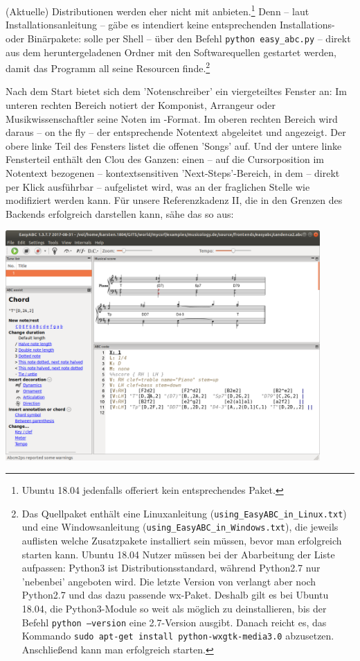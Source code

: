 (Aktuelle) Distributionen werden  eher nicht mit
anbieten.\footnote{Ubuntu 18.04 jedenfalls offeriert kein entsprechendes Paket.}
Denn -- laut  Installationsanleitung -- gäbe es intendiert keine
entsprechenden Installations- oder Binärpakete:  solle per Shell --
über den Befehl \texttt{python easy\_abc.py} -- direkt aus dem heruntergeladenen
Ordner mit den Softwarequellen gestartet werden, damit das Programm all seine
Resourcen finde.\footnote{Das Quellpaket enthält eine Linuxanleitung
(\texttt{using\_EasyABC\_in\_Linux.txt}) und eine Windowsanleitung
(\texttt{using\_EasyABC\_in\_Windows.txt}), die jeweils auflisten welche
Zusatzpakete installiert sein müssen, bevor man  erfolgreich
starten kann. Ubuntu 18.04 Nutzer müssen bei der Abarbeitung der Liste
aufpassen: Python3 ist Distributionsstandard, während Python2.7 nur 'nebenbei'
angeboten wird. Die letzte Version von  verlangt aber noch
Python2.7 und das dazu passende wx-Paket. Deshalb gilt es bei Ubuntu 18.04, die
Python3-Module so weit als möglich zu deinstallieren, bis der Befehl
\texttt{python --version} eine 2.7-Version ausgibt. Danach reicht es, das
Kommando \texttt{sudo apt-get install python-wxgtk-media3.0}
abzusetzen. Anschließend kann man  erfolgreich starten.}

Nach dem Start bietet sich dem 'Notenschreiber' ein viergeteiltes Fenster an: Im
unteren rechten Bereich notiert der Komponist, Arrangeur oder
Musikwissenschaftler seine Noten im -Format. Im oberen rechten Bereich
wird daraus -- on the fly -- der entsprechende Notentext abgeleitet und
angezeigt. Der obere linke Teil des Fensters listet die offenen 'Songs' auf. Und
der untere linke Fensterteil enthält den Clou des Ganzen: einen -- auf die
Cursorposition im Notentext bezogenen -- kontextsensitiven 'Next-Steps'-Bereich,
in dem -- direkt per Klick ausführbar -- aufgelistet wird, was an der fraglichen
Stelle wie modifiziert werden kann. Für unsere Referenzkadenz II, die
 in den Grenzen des Backends erfolgreich darstellen kann, sähe das
so aus:

\begin{center}
\includegraphics[width=0.9\textwidth]{frontends/easyabc/easyabc-cadenca2-300dpi.png}
\end{center}

